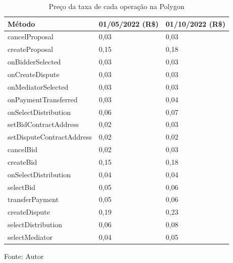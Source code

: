 \begin{table}[!h]
\centering
\caption{Preço da taxa de cada operação na Polygon}
\label{tab:report_prices_per_method_polygon}
\begin{tabular}{@{}lll@{}}
\toprule
Método & 01/05/2022 (R\$) & 01/10/2022 (R\$) \\ \midrule
cancelProposal & 0,03 & 0,03 \\
createProposal & 0,15 & 0,18 \\
onBidderSelected & 0,03 & 0,03 \\
onCreateDispute & 0,03 & 0,03 \\
onMediatorSelected & 0,03 & 0,03 \\
onPaymentTransferred & 0,03 & 0,04 \\
onSelectDistribution & 0,06 & 0,07 \\
setBidContractAddress & 0,02 & 0,03 \\
setDisputeContractAddress & 0,02 & 0,02 \\
cancelBid & 0,02 & 0,03 \\
createBid & 0,15 & 0,18 \\
onSelectDistribution & 0,04 & 0,04 \\
selectBid & 0,05 & 0,06 \\
transferPayment & 0,05 & 0,06 \\
createDispute & 0,19 & 0,23 \\
selectDistribution & 0,06 & 0,08 \\
selectMediator & 0,04 & 0,05 \\ \bottomrule
\end{tabular}
\begin{tablenotes}
  \small
  \item Fonte: Autor
\end{tablenotes}
\end{table}